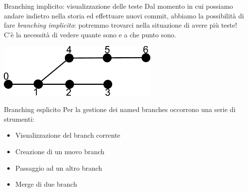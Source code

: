 \documentclass[presentation]{beamer}
\begin{document}
\begin{frame}{Branching implicito: visualizzazione delle teste}
	Dal momento in cui possiamo andare indietro nella storia ed effettuare nuovi commit, abbiamo la possibilità di fare \textit{branching implicito}: potremmo trovarci nella situazione di avere più teste! C'è la necessità di vedere quante sono e a che punto sono.
	\begin{center}
		\includegraphics[width=0.6\textwidth]{img/branch}
	\end{center}
\end{frame}

\begin{frame}{Branching esplicito}
	Per la gestione dei named branches occorrono una serie di strumenti:
	\begin{itemize}
		\item Visualizzazione del branch corrente
		\item Creazione di un nuovo branch
		\item Passaggio ad un altro branch
		\item Merge di due branch
	\end{itemize}
\end{frame}
\end{document}
